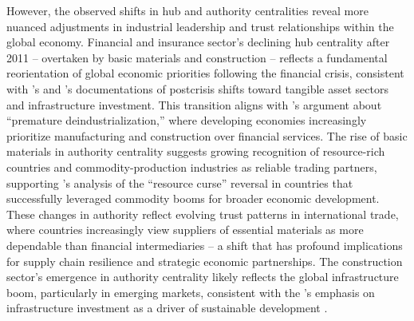\documentclass[preprint, 3p,
authoryear]{elsarticle} %
\begin{document}
However, the observed shifts in hub and authority centralities reveal
more nuanced adjustments in industrial leadership and trust
relationships within the global economy. Financial and insurance
sector's declining hub centrality after 2011 -- overtaken by basic
materials and construction -- reflects a fundamental reorientation of
global economic priorities following the financial crisis, consistent
with \citet{reinhart2009time}'s and \citet{kose2022aftermath}'s
documentations of postcrisis shifts toward tangible asset sectors and
infrastructure investment. This transition aligns with
\citet{rodrik2016premature}'s argument about ``premature
deindustrialization,'' where developing economies increasingly
prioritize manufacturing and construction over financial services. The
rise of basic materials in authority centrality suggests growing
recognition of resource-rich countries and commodity-production
industries as reliable trading partners, supporting
\citet{venables2016using}'s analysis of the ``resource curse'' reversal
in countries that successfully leveraged commodity booms for broader
economic development. These changes in authority reflect evolving trust
patterns in international trade, where countries increasingly view
suppliers of essential materials as more dependable than financial
intermediaries -- a shift that has profound implications for supply
chain resilience and strategic economic partnerships. The construction
sector's emergence in authority centrality likely reflects the global
infrastructure boom, particularly in emerging markets, consistent with
the \citet{world2017world}'s emphasis on infrastructure investment as a
driver of sustainable development \citep{knack2025does}.
\end{document}
